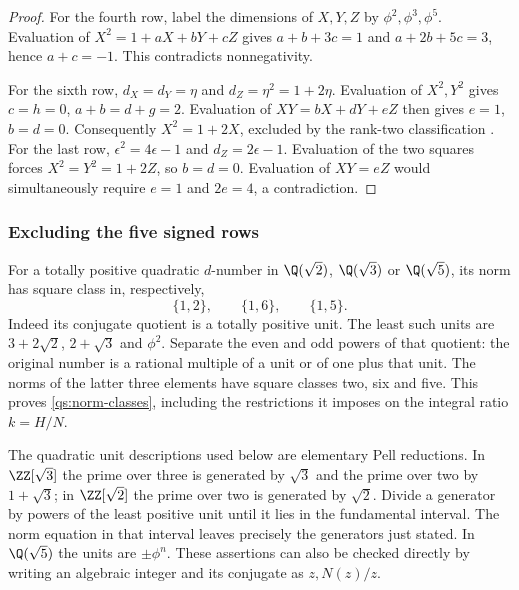 \begin{proof}
For the fourth row, label the dimensions of $X,Y,Z$ by
$\phi^2,\phi^3,\phi^5$. Evaluation of
$X^2=1+aX+bY+cZ$ gives
$a+b+3c=1$ and $a+2b+5c=3$, hence $a+c=-1$.
This contradicts nonnegativity.

For the sixth row, $d_X=d_Y=\eta$ and $d_Z=\eta^2=1+2\eta$.
Evaluation of $X^2,Y^2$ gives $c=h=0$, $a+b=d+g=2$.
Evaluation of $XY=bX+dY+eZ$ then gives $e=1$, $b=d=0$.
Consequently $X^2=1+2X$, excluded by the rank-two classification
\cite{OstrikRankTwo}.
For the last row, $\epsilon^2=4\epsilon-1$ and $d_Z=2\epsilon-1$.
Evaluation of the two squares forces $X^2=Y^2=1+2Z$, so
$b=d=0$. Evaluation of $XY=eZ$ would simultaneously require
$e=1$ and $2e=4$, a contradiction.
\end{proof}

\subsubsection{Excluding the five signed rows}

For a totally positive quadratic $d$-number in
$\Q(\sqrt2)$, $\Q(\sqrt3)$ or $\Q(\sqrt5)$,
its norm has square class in, respectively,
\begin{equation}\label{qs:norm-classes}
 \{1,2\},\qquad\{1,6\},\qquad\{1,5\}.
\end{equation}
Indeed its conjugate quotient is a totally positive unit. The least
such units are $3+2\sqrt2$, $2+\sqrt3$ and $\phi^2$. Separate the
even and odd powers of that quotient: the original number is a rational
multiple of a unit or of one plus that unit. The norms of the latter
three elements have square classes two, six and five. This proves
\eqref{qs:norm-classes}, including the restrictions it imposes on the
integral ratio $k=H/N$.

The quadratic unit descriptions used below are elementary Pell
reductions. In $\ZZ[\sqrt3]$ the prime over three is generated by
$\sqrt3$ and the prime over two by $1+\sqrt3$; in
$\ZZ[\sqrt2]$ the prime over two is generated by $\sqrt2$.
Divide a generator by powers of the least positive unit until it lies
in the fundamental interval. The norm equation in that interval leaves
precisely the generators just stated. In $\Q(\sqrt5)$ the units
are $\pm\phi^n$. These assertions can also be checked directly by
writing an algebraic integer and its conjugate as $z,N(z)/z$.

